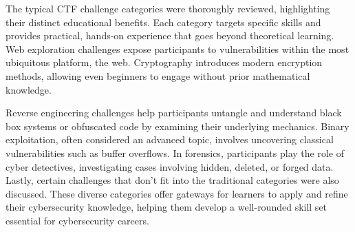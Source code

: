 \documentclass[conference]{IEEEtran}
\begin{document}
The typical CTF challenge categories were thoroughly reviewed, highlighting
their distinct educational benefits. Each category targets specific skills and
provides practical, hands-on experience that goes beyond theoretical learning.
Web exploration challenges expose participants to
vulnerabilities within the most ubiquitous platform, the web.
Cryptography introduces modern encryption methods, allowing even beginners to
engage without prior mathematical knowledge.

Reverse engineering challenges help participants untangle and understand
black box systems or obfuscated code by examining their underlying mechanics. Binary
exploitation, often considered an advanced topic, involves uncovering classical
vulnerabilities such as buffer overflows. In forensics, participants play the
role of cyber detectives, investigating cases involving hidden, deleted, or
forged data. Lastly, certain challenges that don’t fit into the traditional
categories were also discussed. These diverse categories offer gateways for
learners to apply and refine their cybersecurity knowledge, helping them
develop a well-rounded skill set essential for cybersecurity careers.



\end{document}
